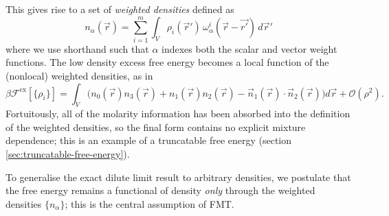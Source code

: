 This gives rise to a set of \emph{weighted densities} defined as \cite{RosenfeldPRL1989,PercusJSP1988}
\begin{equation}
  n_\alpha(\vec{r})
  =
  \sum_{i=1}^m \int_V
  \rho_i(\vec{r}') \, \omega_\alpha^i(\vec{r} - \vec{r'})
  \, d\vec{r}'
\end{equation}
where we use shorthand such that $\alpha$ indexes both the scalar and vector weight functions.
The low density excess free energy becomes a local function of the (nonlocal) weighted densities, as in
\begin{equation*}
  \beta \mathcal{F}^\mathrm{ex}[\{\rho_i\}]
  =
  \int_V \Big(
  n_0(\vec{r}) n_3(\vec{r})
  + n_1(\vec{r}) n_2(\vec{r})
  - \vec{n}_1(\vec{r}) \cdot \vec{n}_2(\vec{r})
  \Big) d\vec{r}
  + \mathcal{O}(\rho^2).
\end{equation*}
Fortuitously, all of the molarity information has been absorbed into the definition of the weighted densities, so the final form contains no explicit mixture dependence; this is an example of a truncatable free energy (section \ref{sec:truncatable-free-energy}).

To generalise the exact dilute limit result to arbitrary densities, we postulate that the free energy remains a functional of density \emph{only} through the weighted densities $\{n_\alpha\}$; this is the central assumption of FMT.

